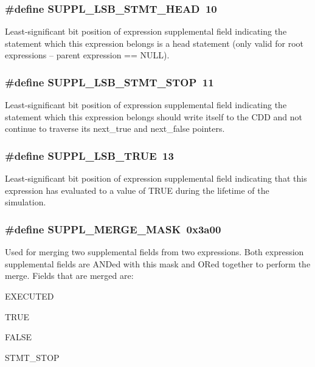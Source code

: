 \subsubsection{\setlength{\rightskip}{0pt plus 5cm}\#define SUPPL\_\-LSB\_\-STMT\_\-HEAD\ 10}\label{group__expr__suppl_a3}


Least-significant bit position of expression supplemental field indicating the statement which this expression belongs is a head statement (only valid for root expressions -- parent expression == NULL). 
\subsubsection{\setlength{\rightskip}{0pt plus 5cm}\#define SUPPL\_\-LSB\_\-STMT\_\-STOP\ 11}\label{group__expr__suppl_a4}


Least-significant bit position of expression supplemental field indicating the statement which this expression belongs should write itself to the CDD and not continue to traverse its next\_\-true and next\_\-false pointers. 
\subsubsection{\setlength{\rightskip}{0pt plus 5cm}\#define SUPPL\_\-LSB\_\-TRUE\ 13}\label{group__expr__suppl_a6}


Least-significant bit position of expression supplemental field indicating that this expression has evaluated to a value of TRUE during the lifetime of the simulation. 
\subsubsection{\setlength{\rightskip}{0pt plus 5cm}\#define SUPPL\_\-MERGE\_\-MASK\ 0x3a00}\label{group__expr__suppl_a10}


Used for merging two supplemental fields from two expressions. Both expression supplemental fields are ANDed with this mask and ORed together to perform the merge. Fields that are merged are:\begin{CompactItemize}
\item 
EXECUTED\item 
TRUE\item 
FALSE\item 
STMT\_\-STOP \end{CompactItemize}
